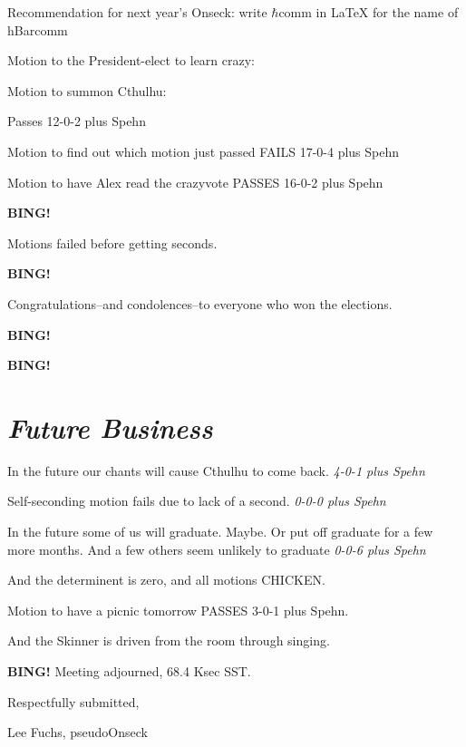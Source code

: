 \documentclass[10pt]{article}
\newcommand{\bing}{{\bf BING!} }
\newcommand{\goto}[1]{\bing \vskip 12pt \section*{{\em{#1}}}}
\newcommand{\ps}{ plus Spehn\xspace}
\newcommand{\onseck}{Lee Fuchs, pseudoOnseck}
\begin{document}
Recommendation for next year's Onseck: write $\hbar$comm in LaTeX for the name of hBarcomm

Motion to the President-elect to learn crazy:

Motion to summon Cthulhu:

Passes 12-0-2 plus Spehn

Motion to find out which motion just passed FAILS 17-0-4 plus Spehn

Motion to have Alex read the crazyvote PASSES 16-0-2 plus Spehn

\bing

Motions failed before getting seconds.

\bing

Congratulations--and condolences--to everyone who won the elections.

\bing

\goto{Future Business}

In the future our chants will cause Cthulhu to come back. \emph{4-0-1\ps}

Self-seconding motion fails due to lack of a second. \emph{0-0-0\ps}

In the future some of us will graduate. Maybe. 
Or put off graduate for a few more months. 
And a few others seem unlikely to graduate \emph{0-0-6\ps}

And the determinent is zero, and all motions CHICKEN.

Motion to have a picnic tomorrow PASSES 3-0-1\ps.

And the Skinner is driven from the room through singing.

\bing
\noindent
Meeting adjourned, 68.4 Ksec SST.

\vspace{18pt}

\centerline{Respectfully submitted,}
\centerline{\onseck}
\end{document}
